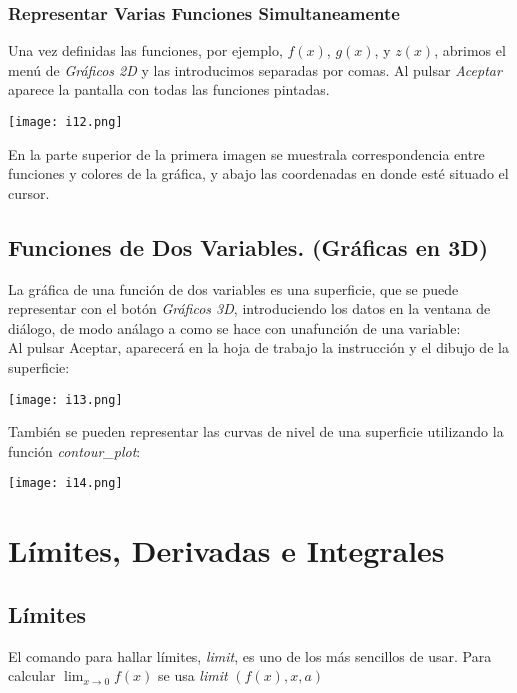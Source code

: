 \documentclass[12pt]{article}
\begin{document}
\subsubsection*{Representar Varias Funciones Simultaneamente}

Una vez definidas las funciones, por ejemplo, $f(x)$, $g(x)$, y $z(x)$, abrimos el menú de \textit{Gráficos 2D} y las introducimos separadas por comas. Al pulsar \textit{Aceptar} aparece la pantalla con todas las funciones pintadas.

\begin{center}
   \texttt{[image: i12.png]}\\
\end{center}

En la parte superior de la primera imagen se muestrala correspondencia entre funciones y colores de la gráfica, y abajo las coordenadas en donde esté situado el cursor.

\subsection*{Funciones de Dos Variables. (Gráficas en 3D)}
La gráfica de una función de dos variables es una superficie, que se puede representar con el botón \textit{Gráficos 3D}, introduciendo los datos en la ventana de diálogo, de modo análago a como se hace con unafunción de una variable:\\

Al pulsar Aceptar, aparecerá en la hoja de trabajo la instrucción y el dibujo de la superficie:
\begin{center}
   \texttt{[image: i13.png]}\\
\end{center}

También se pueden representar las curvas de nivel de una superficie utilizando la función \textit{contour\_plot}:

\begin{center}
   \texttt{[image: i14.png]}\\
\end{center}

\section*{Límites, Derivadas e Integrales}
\subsection*{Límites}
El comando para hallar límites, \textit{limit}, es uno de los más sencillos de usar. Para calcular  $\lim_{x \to 0} f(x)$ se usa \textit{limit} $(f(x), x, a)$
\end{document}
